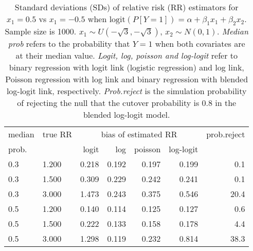 \documentclass[12pt,a4paper]{article}
\begin{document}
\begin{table}[H] 
\small\sf\centering 
\caption{Standard deviations (SDs) of relative risk (RR) estimators for $x_1=0.5$ vs $x_1=-0.5$ when $\mbox{logit}(P[Y=1])=\alpha+\beta_1 x_1 + \beta_2 x_2$. Sample size is 1000. $x_1 \sim $$U(-\sqrt{3},-\sqrt{3})$, $x_2 \sim N(0,1)$. {\it Median prob} refers to the probability that $Y=1$ when both covariates are at their median value. {\it Logit, log, poisson and log-logit} refer to binary regression with logit link (logistic regression) and log link, Poisson regression with log link and binary regression with blended log-logit link, respectively. {\it Prob.reject} is the simulation probability of rejecting the null that the cutover probability is $0.8$ in the blended log-logit model.} 
\begin{tabular}{llrrrrr} 
\toprule 
median & true RR & \multicolumn{4}{c}{bias of estimated RR} & prob.reject \\ 
prob. & & logit & log & poisson & log-logit  & \\ \midrule 
0.3 & 1.200 & 0.218 & 0.192 & 0.197 & 0.199 &  0.1 \\  
0.3 & 1.500 & 0.309 & 0.229 & 0.242 & 0.241 &  0.1 \\  
0.3 & 3.000 & 1.473 & 0.243 & 0.375 & 0.546 & 20.4 \\  
0.5 & 1.200 & 0.140 & 0.114 & 0.125 & 0.127 &  0.6 \\  
0.5 & 1.500 & 0.222 & 0.133 & 0.158 & 0.178 &  4.4 \\  
0.5 & 3.000 & 1.298 & 0.119 & 0.232 & 0.814 & 38.3 \\  
\bottomrule 
\end{tabular} 
\end{table} 
\end{document}
